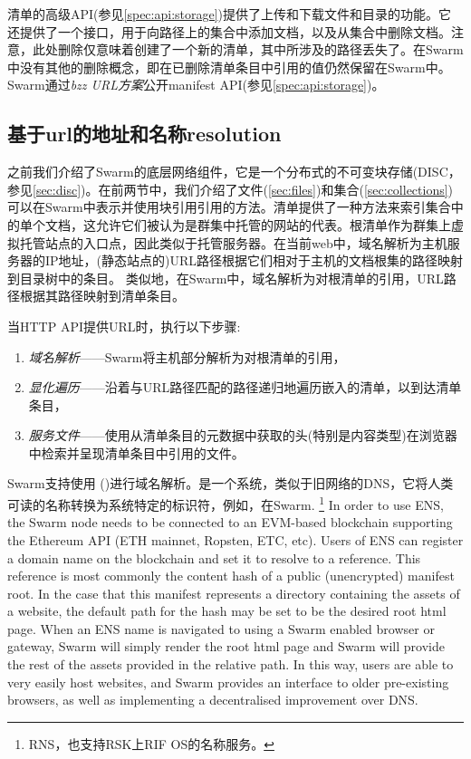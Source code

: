 清单的高级API(参见\ref{spec:api:storage})提供了上传和下载文件和目录的功能。它还提供了一个接口，用于向路径上的集合中添加文档，以及从集合中删除文档。注意，此处删除仅意味着创建了一个新的清单，其中所涉及的路径丢失了。在Swarm中没有其他的删除概念，即在已删除清单条目中引用的值仍然保留在Swarm中。Swarm通过\emph{bzz URL方案}公开manifest API(参见\ref{spec:api:storage})。

\subsection{基于url的地址和名称resolution\statusgreen}\label{sec:urls}

之前我们介绍了Swarm的底层网络组件，它是一个分布式的不可变块存储(DISC，参见\ref{sec:disc})。在前两节中，我们介绍了文件(\ref{sec:files})和集合(\ref{sec:collections})可以在Swarm中表示并使用块引用引用的方法。清单提供了一种方法来索引集合中的单个文档，这允许它们被认为是群集中托管的网站的代表。根清单作为群集上虚拟托管站点的入口点，因此类似于托管服务器。在当前web中，域名解析为主机服务器的IP地址，(静态站点的)URL路径根据它们相对于主机的文档根集的路径映射到目录树中的条目。
类似地，在Swarm中，域名解析为对根清单的引用，URL路径根据其路径映射到清单条目。

当HTTP API提供URL时，执行以下步骤:

\begin{enumerate}
    \item \emph{域名解析}——Swarm将主机部分解析为对根清单的引用，
    \item \emph{显化遍历}——沿着与URL路径匹配的路径递归地遍历嵌入的清单，以到达清单条目，
    \item \emph{服务文件}——使用从清单条目的元数据中获取的头(特别是内容类型)在浏览器中检索并呈现清单条目中引用的文件。
\end{enumerate}

Swarm支持使用 ()进行域名解析。是一个系统，类似于旧网络的DNS，它将人类可读的名称转换为系统特定的标识符，例如，在Swarm.%
\footnote{RNS，也支持RSK上RIF OS的名称服务。}
%
In order to use ENS, the Swarm node needs to be connected to an EVM-based blockchain supporting the Ethereum API (ETH mainnet, Ropsten, ETC, etc). 
Users of ENS can register a domain name on the blockchain and set it to resolve to a reference. This reference is most commonly the content hash of a public (unencrypted) manifest root. In the case that this manifest represents a directory containing the assets of a website, the default path for the hash may be set to be the desired root html page. When an ENS name is navigated to using a Swarm enabled browser or gateway, Swarm will simply render the root html page and Swarm will provide the rest of the assets provided in the relative path. In this way, users are able to very easily host websites, and Swarm provides an interface to older pre-existing browsers, as well as implementing a decentralised improvement over DNS.


